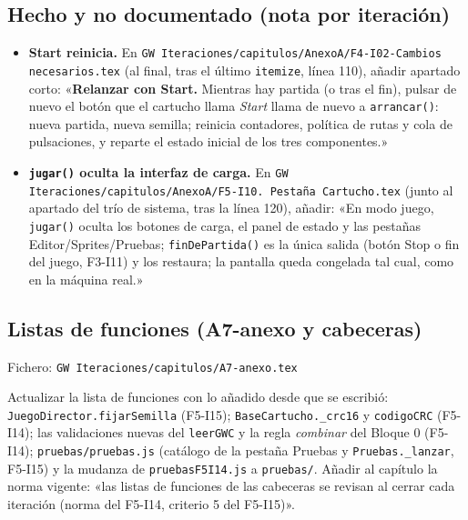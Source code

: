 \subsection{Hecho y no documentado (nota por iteración)}
\label{sec:F5I16Hecho}

\begin{itemize}
\item \textbf{Start reinicia.} En
\texttt{GW Iteraciones/capitulos/AnexoA/F4-I02-Cambios necesarios.tex}
(al final, tras el último \texttt{itemize}, línea 110), añadir
apartado corto: «\textbf{Relanzar con Start.} Mientras hay partida
(o tras el fin), pulsar de nuevo el botón que el cartucho llama
\emph{Start} llama de nuevo a \texttt{arrancar()}: nueva partida,
nueva semilla; reinicia contadores, política de rutas y cola de
pulsaciones, y reparte el estado inicial de los tres
componentes.»
\item \textbf{\texttt{jugar()} oculta la interfaz de carga.} En
\texttt{GW Iteraciones/capitulos/AnexoA/F5-I10. Pestaña
Cartucho.tex} (junto al apartado del trío de sistema, tras la
línea 120), añadir: «En modo juego, \texttt{jugar()} oculta los
botones de carga, el panel de estado y las pestañas
Editor/Sprites/Pruebas; \texttt{finDePartida()} es la única salida
(botón Stop o fin del juego, F3-I11) y los restaura; la pantalla
queda congelada tal cual, como en la máquina real.»
\end{itemize}

\subsection{Listas de funciones (A7-anexo y cabeceras)}
\label{sec:F5I16A7}

Fichero: \texttt{GW Iteraciones/capitulos/A7-anexo.tex}

Actualizar la lista de funciones con lo añadido desde que se escribió:
\texttt{JuegoDirector.fijarSemilla} (F5-I15);
\texttt{BaseCartucho.\_crc16} y \texttt{codigoCRC} (F5-I14); las
validaciones nuevas del \texttt{leerGWC} y la regla \emph{combinar} del
Bloque 0 (F5-I14); \texttt{pruebas/pruebas.js} (catálogo de la pestaña
Pruebas y \texttt{Pruebas.\_lanzar}, F5-I15) y la mudanza de
\texttt{pruebasF5I14.js} a \texttt{pruebas/}. Añadir al capítulo la
norma vigente: «las listas de funciones de las cabeceras se revisan al
cerrar cada iteración (norma del F5-I14, criterio 5 del F5-I15)».